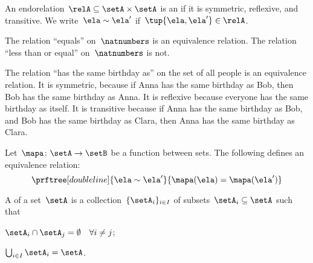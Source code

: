 \devel{ }%

\begin{definition}
    \label{def:equivalence-relation}
    An endorelation~$\relA\subseteq \setA\times \setA$ is an \emph{} if it is symmetric, reflexive, and transitive. We write~$\ela\sim \ela'$ if~$\tup{\ela,\ela'}\in \relA$.
\end{definition}

\begin{example}
    The relation ``equals'' on~$\natnumbers$ is an equivalence relation.
    The relation ``less than or equal'' on~$\natnumbers$ is not.
\end{example}

\begin{example}
    The relation ``has the same birthday as'' on the set of all people is an equivalence relation.
    It is symmetric, because if Anna has the same birthday as Bob, then Bob has the same birthday as Anna.
    It is reflexive because everyone has the same birthday as itself.
    It is transitive because if Anna has the same birthday as Bob, and Bob has the same birthday as Clara, then Anna has the same birthday as Clara.
\end{example}

\begin{example}
    Let~$\mapa\colon \setA\to \setB$ be a function between sets.
    The following defines an equivalence relation:
    \begin{equation*}
        \prftree[double line]{\ela\sim \ela'}{\mapa(\ela)=\mapa(\ela')}
    \end{equation*}
\end{example}

\begin{definition}[Partition]
    \label{def:partition}
    A \emph{} of a set~$\setA$ is a collection~$\{\setA_i\}_{i\in I}$ of subsets~$\setA_i\subseteq \setA$ such that
    \begin{compactenum}
        \item $\setA_i\cap \setA_j=\emptyset \quad \forall i\neq j$;
        \item $\bigcup_{i\in I}\setA_i=\setA$.
    \end{compactenum}
\end{definition}

